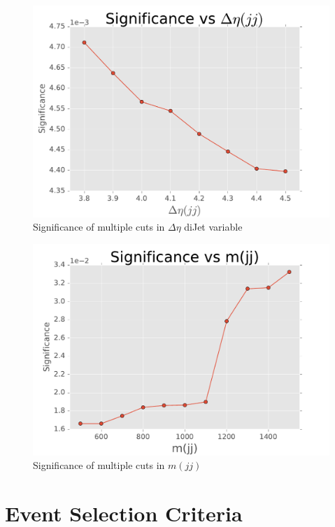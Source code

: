 \begin{figure}[htbp!]
\centering
\includegraphics[width = \linewidth]{significance_deltaEta.pdf}
\caption{Significance of multiple cuts in $\Delta \eta$ diJet variable}
\label{fig: significanceDeltaEta}
\end{figure}


\begin{figure}[htbp!]
\centering
\includegraphics[width = \linewidth]{significance_mass.pdf}
\caption{Significance of multiple cuts in $m(jj)$}
\label{fig: significanceMass}
\end{figure}


\section{Event Selection Criteria}\label{sec: selectionCriteria}

